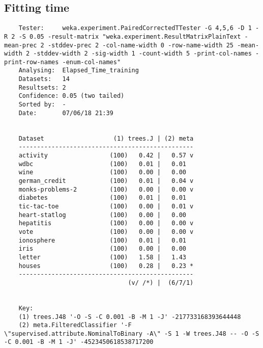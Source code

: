 \subsection{Fitting time}
\begin{verbatim}
    Tester:     weka.experiment.PairedCorrectedTTester -G 4,5,6 -D 1 -R 2 -S 0.05 -result-matrix "weka.experiment.ResultMatrixPlainText -mean-prec 2 -stddev-prec 2 -col-name-width 0 -row-name-width 25 -mean-width 2 -stddev-width 2 -sig-width 1 -count-width 5 -print-col-names -print-row-names -enum-col-names"
    Analysing:  Elapsed_Time_training
    Datasets:   14
    Resultsets: 2
    Confidence: 0.05 (two tailed)
    Sorted by:  -
    Date:       07/06/18 21:39
    
    
    Dataset                   (1) trees.J | (2) meta
    ------------------------------------------------
    activity                 (100)   0.42 |   0.57 v
    wdbc                     (100)   0.01 |   0.01  
    wine                     (100)   0.00 |   0.00  
    german_credit            (100)   0.01 |   0.04 v
    monks-problems-2         (100)   0.00 |   0.00 v
    diabetes                 (100)   0.01 |   0.01  
    tic-tac-toe              (100)   0.00 |   0.01 v
    heart-statlog            (100)   0.00 |   0.00  
    hepatitis                (100)   0.00 |   0.00 v
    vote                     (100)   0.00 |   0.00 v
    ionosphere               (100)   0.01 |   0.01  
    iris                     (100)   0.00 |   0.00  
    letter                   (100)   1.58 |   1.43  
    houses                   (100)   0.28 |   0.23 *
    ------------------------------------------------
                                  (v/ /*) |  (6/7/1)
    
    
    Key:
    (1) trees.J48 '-O -S -C 0.001 -B -M 1 -J' -217733168393644448
    (2) meta.FilteredClassifier '-F \"supervised.attribute.NominalToBinary -A\" -S 1 -W trees.J48 -- -O -S -C 0.001 -B -M 1 -J' -4523450618538717200    
\end{verbatim}

